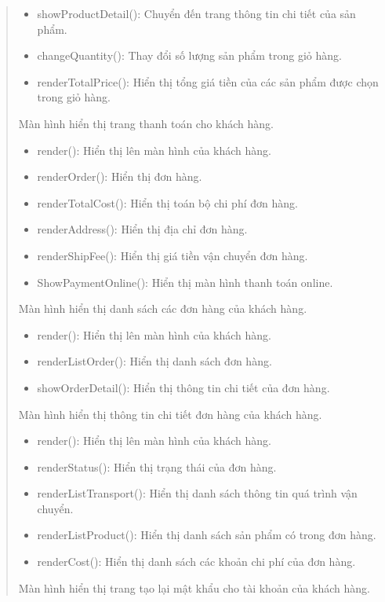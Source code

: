 \begin{quote}
\begin{itemize}
		\item showProductDetail(): Chuyển đến trang thông tin chi tiết của sản phẩm.
		\item changeQuantity(): Thay đổi số lượng sản phẩm trong giỏ hàng.
		\item renderTotalPrice(): Hiển thị tổng giá tiền của các sản phẩm được chọn trong giỏ hàng.
	\end{itemize}
	Màn hình hiển thị trang thanh toán cho khách hàng.
	\begin{itemize}
		\item render(): Hiển thị lên màn hình của khách hàng.
		\item renderOrder(): Hiển thị đơn hàng.
		\item renderTotalCost(): Hiển thị toán bộ chi phí đơn hàng.
		\item renderAddress(): Hiển thị địa chỉ đơn hàng.
		\item renderShipFee(): Hiển thị giá tiền vận chuyển đơn hàng.
		\item ShowPaymentOnline(): Hiển thị màn hình thanh toán online.
	\end{itemize}
	Màn hình hiển thị danh sách các đơn hàng của khách hàng.
	\begin{itemize}
		\item render(): Hiển thị lên màn hình của khách hàng.
		\item renderListOrder(): Hiển thị danh sách đơn hàng.
		\item showOrderDetail(): Hiển thị thông tin chi tiết của đơn hàng.
	\end{itemize}
	Màn hình hiển thị thông tin chi tiết đơn hàng của khách hàng.
	\begin{itemize}
		\item render(): Hiển thị lên màn hình của khách hàng.
		\item renderStatus(): Hiển thị trạng thái của đơn hàng.
		\item renderListTransport(): Hiển thị danh sách thông tin quá trình vận chuyển.
		\item renderListProduct(): Hiển thị danh sách sản phẩm có trong đơn hàng.
		\item renderCost(): Hiển thị danh sách các khoản chi phí của đơn hàng.
	\end{itemize}
	Màn hình hiển thị trang tạo lại mật khẩu cho tài khoản của khách hàng.
	\begin{itemize}

\end{itemize}
\end{quote}

